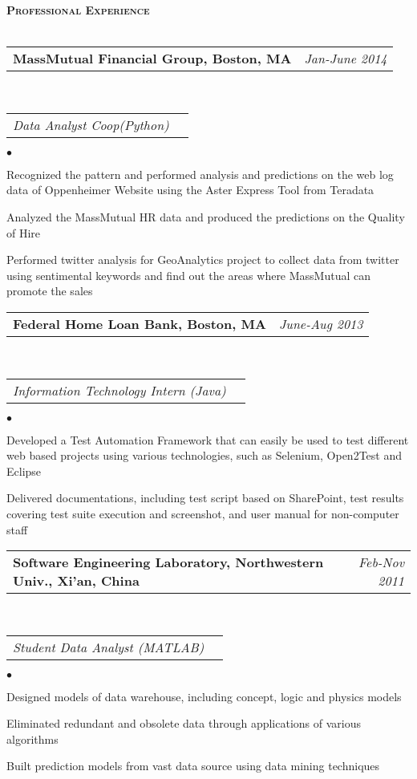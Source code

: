 \documentclass[11pt]{article}
\makeatletter
\newcommand{\lineunder}{\vspace*{-8pt} \\ \hspace*{-18pt} \hrulefill \\}
\newcommand{\header}[1]{{\hspace*{-15pt}\vspace*{6pt} \large \textsc{\textbf{#1}}} \vspace*{-6pt} \lineunder}
\newenvironment{achievements}{\begin{list}{$\bullet$}{\topsep 0pt \itemsep -2pt}}{\vspace*{4pt}\end{list}}
\newcommand{\headerrow}[2]
{\begin{tabular*}{\linewidth}{l@{\extracolsep{\fill}}r}
	\hspace*{-15pt}#1 & #2 \\
\end{tabular*}}
\newcommand{\headerrowww}[1]
{\begin{tabular*}{\linewidth}{l@{\extracolsep{\fill}}r}
	#1 &\\
\end{tabular*}}
\makeatother
\begin{document}
\vspace*{2.5pt}
\header{Professional Experience}

\headerrow
{\textbf{MassMutual Financial Group, Boston, MA}}
{\emph{Jan-June 2014}}
\\
\headerrowww
{\emph{Data Analyst Coop(Python)}}
	\begin{achievements}
	\item Recognized the pattern and performed analysis and predictions on the web log data of Oppenheimer Website using the Aster Express Tool from Teradata
	\item Analyzed the MassMutual HR data and produced the predictions on the Quality of Hire
	\item Performed twitter analysis for GeoAnalytics project to collect data from twitter using sentimental keywords and find out the areas where MassMutual can promote the sales
	\end{achievements}
	

\headerrow
{\textbf{Federal Home Loan Bank, Boston, MA}}
{\emph{June-Aug 2013}}
\\
\headerrowww
{\emph{Information Technology Intern (Java)}}
	\begin{achievements}
	\item Developed a Test Automation Framework that can easily be used to test different web based projects 
	using various technologies, such as Selenium, Open2Test and Eclipse
	\item Delivered  documentations, including test script based on SharePoint, test results covering 
	test suite execution and screenshot, and user manual for non-computer staff 
	\end{achievements}
	
\headerrow
{\textbf{Software Engineering Laboratory, Northwestern Univ., Xi'an, China}}
{\emph{Feb-Nov 2011}}
\\
\headerrowww
{\emph{Student Data Analyst (MATLAB)}}
	\begin{achievements}
	\item Designed models of data warehouse, including concept, logic and physics models
	\item Eliminated redundant and obsolete data through applications of various algorithms
	\item Built prediction models from vast data source using data mining techniques
	\end{achievements}
	
\end{document}
